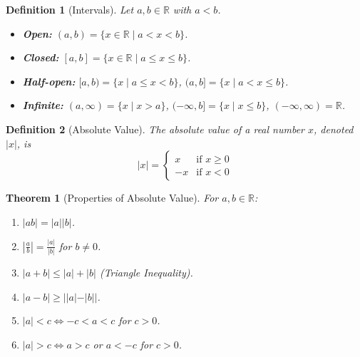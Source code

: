 \documentclass[11pt,a4paper]{article}
\newtheorem{theorem}{Theorem}
\newtheorem{definition}{Definition}
\begin{document}
\begin{definition}[Intervals]
Let $a, b \in \mathbb{R}$ with $a < b$.
\begin{itemize}
\item \textbf{Open:} $(a, b) = \{x \in \mathbb{R} \mid a < x < b\}$.
\item \textbf{Closed:} $[a, b] = \{x \in \mathbb{R} \mid a \leq x \leq b\}$.
\item \textbf{Half-open:} $[a, b) = \{x \mid a \leq x < b\}$, $(a, b] = \{x \mid a < x \leq b\}$.
\item \textbf{Infinite:} $(a, \infty) = \{x \mid x > a\}$, $(-\infty, b] = \{x \mid x \leq b\}$, $(-\infty, \infty) = \mathbb{R}$.
\end{itemize}
\end{definition}
\begin{definition}[Absolute Value]
The absolute value of a real number $x$, denoted $|x|$, is
\[
|x| = \begin{cases} x & \text{if } x \geq 0 \\ -x & \text{if } x < 0 \end{cases}
\]
\end{definition}
\begin{theorem}[Properties of Absolute Value]
For $a, b \in \mathbb{R}$:
\begin{enumerate}
\item $|ab| = |a||b|$.
\item $\left|\frac{a}{b}\right| = \frac{|a|}{|b|}$ for $b \neq 0$.
\item $|a + b| \leq |a| + |b|$ (Triangle Inequality).
\item $|a - b| \geq ||a| - |b||$.
\item $|a| < c \iff -c < a < c$ for $c > 0$.
\item $|a| > c \iff a > c$ or $a < -c$ for $c > 0$.
\end{enumerate}
\end{theorem}
\end{document}
